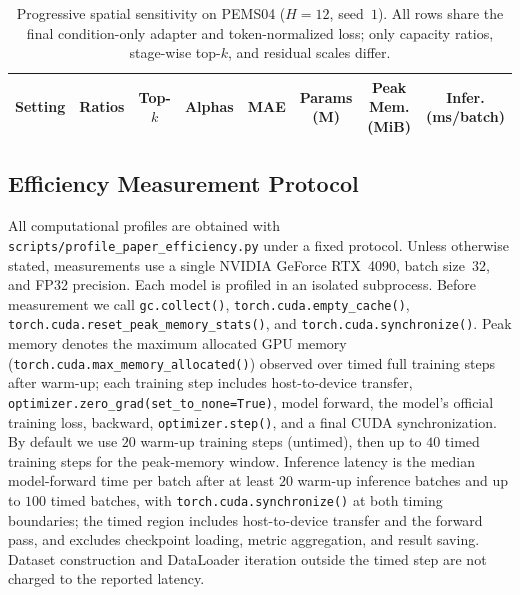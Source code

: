 \begin{table}[t]
\centering
\caption{Progressive spatial sensitivity on PEMS04 ($H{=}12$, seed~$1$). All rows share the final condition-only adapter and token-normalized loss; only capacity ratios, stage-wise top-$k$, and residual scales differ.}
\label{tab:spatial-sensitivity}
\fontsize{8.5pt}{10pt}\selectfont
\setlength{\tabcolsep}{3pt}
\renewcommand{\arraystretch}{1.12}
\begin{tabular}{lccccccc}
\toprule
\textbf{Setting}
& \textbf{Ratios}
& \textbf{Top-$k$}
& \textbf{Alphas}
& \textbf{MAE}
& \makecell{\textbf{Params}\\\textbf{(M)}}
& \makecell{\textbf{Peak Mem.}\\\textbf{(MiB)}}
& \makecell{\textbf{Infer.}\\\textbf{(ms/batch)}} \\
\midrule
\bottomrule
\end{tabular}
\end{table}

\subsection{Efficiency Measurement Protocol}
\label{app:efficiency-protocol}

All computational profiles are obtained with \texttt{scripts/profile\_paper\_efficiency.py} under a fixed protocol. Unless otherwise stated, measurements use a single NVIDIA GeForce RTX~4090, batch size~$32$, and FP32 precision. Each model is profiled in an isolated subprocess. Before measurement we call \texttt{gc.collect()}, \texttt{torch.cuda.empty\_cache()}, \texttt{torch.cuda.reset\_peak\_memory\_stats()}, and \texttt{torch.cuda.synchronize()}. Peak memory denotes the maximum allocated GPU memory (\texttt{torch.cuda.max\_memory\_allocated()}) observed over timed full training steps after warm-up; each training step includes host-to-device transfer, \texttt{optimizer.zero\_grad(set\_to\_none{=}True)}, model forward, the model's official training loss, backward, \texttt{optimizer.step()}, and a final CUDA synchronization. By default we use $20$ warm-up training steps (untimed), then up to $40$ timed training steps for the peak-memory window. Inference latency is the median model-forward time per batch after at least $20$ warm-up inference batches and up to $100$ timed batches, with \texttt{torch.cuda.synchronize()} at both timing boundaries; the timed region includes host-to-device transfer and the forward pass, and excludes checkpoint loading, metric aggregation, and result saving. Dataset construction and DataLoader iteration outside the timed step are not charged to the reported latency.
